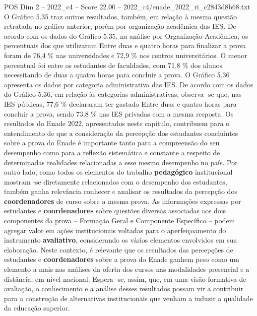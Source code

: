 \begin{textsample}{POS Dim 2 – 2022\_c4 – Score 22.00 – 2022\_c4/enade\_2022\_ri\_c2843d8b68.txt}
O Gráfico 5.35 traz outros resultados, também, em relação à mesma questão retratada no gráfico anterior, porém por organização acadêmica das IES.
De acordo com os dados do Gráfico 5.35, na análise por Organização Acadêmica, os percentuais dos que utilizaram Entre duas e quatro horas para finalizar a prova foram de 76,4 \% nas universidades e 72,9 \% nos centros universitários.
O menor percentual foi entre os estudantes de faculdades, com 71,8 \% dos alunos necessitando de duas a quatro horas para concluir a prova.
O Gráfico 5.36 apresenta os dados por categoria administrativa das IES.
De acordo com os dados do Gráfico 5.36, em relação às categorias administrativas, observa -se que, nas IES públicas, 77,6 \% declararam ter gastado Entre duas e quatro horas para concluir a prova, sendo 73,8 \% nas IES privadas com a mesma resposta.
Os resultados do Enade 2022, apresentados neste capítulo, contribuem para o entendimento de que a consideração da percepção dos estudantes concluintes sobre a prova do Enade é importante tanto para a compreensão do seu desempenho como para a reflexão sistemática e constante a respeito de determinadas realidades relacionadas a esse mesmo desempenho no país.
Por outro lado, como todos os elementos do trabalho \textbf{pedagógico} institucional mostram -se diretamente relacionados com o desempenho dos estudantes, também ganha relevância conhecer e analisar os resultados da percepção dos \textbf{coordenadores} de curso sobre a mesma prova.
As informações expressas por estudantes e \textbf{coordenadores} sobre questões diversas associadas aos dois componentes da prova – Formação Geral e Componente Específico – podem agregar valor em ações institucionais voltadas para o aperfeiçoamento do instrumento \textbf{avaliativo}, considerando os vários elementos envolvidos em sua elaboração.
Neste contexto, é relevante que os resultados das percepções de estudantes e \textbf{coordenadores} sobre a prova do Enade ganhem peso como um elemento a mais nas análises da oferta dos cursos nas modalidades presencial e a distância, em nível nacional.
Espera -se, assim, que, em uma visão formativa de avaliação, o conhecimento e a análise desses resultados possam vir a contribuir para a construção de alternativas institucionais que venham a induzir a qualidade da educação superior.

\end{textsample}
